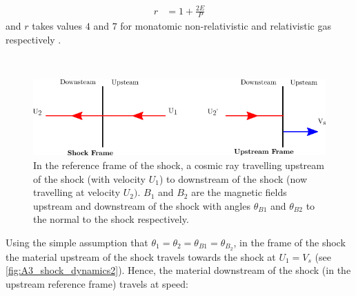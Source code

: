 \begin{equation}
    \begin{aligned}
        r&=1+\frac{2E}{P}
    \end{aligned}
\end{equation}
\noindent and $r$ takes values $4$ and $7$ for monatomic non-relativistic and relativistic gas respectively  \citep{1983RPPh...46..973D}.
\par~\par 
\begin{figure}[h]
	\centering
	\includegraphics[width=1.0\textwidth]{A3_Diffusive_Shock_Acceleration/Images/upstream_downstream.png}
	\caption{In the reference frame of the shock, a cosmic ray travelling upstream of the shock (with velocity $U_1$) to downstream of the shock (now travelling at velocity $U_2)$. $B_1$ and $B_2$ are the magnetic fields upstream and downstream of the shock with angles $\theta_{B1}$ and $\theta_{B2}$ to the normal to the shock respectively.}
	\label{fig:A3_shock_dynamics2}
\end{figure}

Using the simple assumption that $\theta_1=\theta_2=\theta_{B1}=\theta_{B_2}$, in the frame of the shock the material upstream of the shock travels towards the shock at $U_1=V_s$ (see \autoref{fig:A3_shock_dynamics2}). Hence, the material downstream of the shock (in the upstream reference frame) travels at speed:

